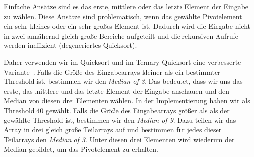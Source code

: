 Einfache Ansätze sind es das erste, mittlere oder das letzte Element der Eingabe zu wählen.
Diese Ansätze sind problematisch, wenn das gewählte Pivotelement ein sehr kleines oder ein sehr großes Element ist.
Dadurch wird die Eingabe nicht in zwei annähernd gleich große Bereiche aufgeteilt und die rekursiven Aufrufe werden ineffizient (degeneriertes Quicksort).

Daher verwenden wir im Quicksort und im Ternary Quicksort eine verbesserte Variante~\cite{ternary_quicksort}.
Falls die Größe des Eingabearrays kleiner als ein bestimmter Threshold ist,
bestimmen wir den \emph{Median of 3}. Das bedeutet, dass wir uns das erste,
das mittlere und das letzte Element der Eingabe anschauen und den Median von diesen drei Elementen wählen.
In der Implementierung haben wir als Threshold $40$ gewählt.
Falls die Größe des Eingabearrays größer als als der gewählte Threshold ist,
bestimmen wir den \emph{Median of 9}. Dazu teilen wir das Array in drei gleich große Teilarrays auf
und bestimmen für jedes dieser Teilarrays den \emph{Median of 3}.
Unter diesen drei Elementen wird wiederum der Median gebildet, um das Pivotelement zu erhalten.